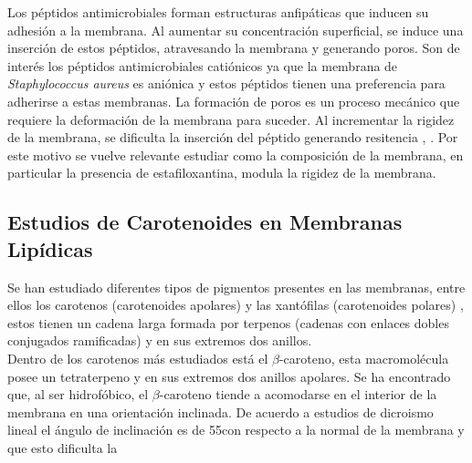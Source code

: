 Los p\'{e}ptidos antimicrobiales forman estructuras anfip\'{a}ticas que inducen su adhesi\'{o}n a la membrana. Al aumentar su concentraci\'{o}n superficial, se induce una inserci\'{o}n de estos p\'{e}ptidos, atravesando la membrana y generando poros. Son de inter\'{e}s los p\'{e}ptidos antimicrobiales cati\'{o}nicos ya que la membrana de \textit{Staphylococcus aureus} es ani\'{o}nica y estos p\'{e}ptidos tienen una preferencia para adherirse a estas membranas. La formaci\'{o}n de poros es un proceso mec\'{a}nico que requiere la deformaci\'{o}n de la membrana para suceder. Al incrementar la rigidez de la membrana, se dificulta la inserci\'{o}n del p\'{e}ptido generando resitencia \cite{Perez-Lopez2019VariationsProperties}, \cite{Nagendra2011}. Por este motivo se vuelve relevante estudiar como la composici\'{o}n de la membrana, en particular la presencia de estafiloxantina, modula la rigidez de la membrana.\\

\subsection{Estudios de Carotenoides en Membranas Lip\'{i}dicas}
Se han estudiado diferentes tipos de pigmentos presentes en las membranas, entre ellos los carotenos (carotenoides apolares) y las xant\'{o}filas (carotenoides polares) \cite{Gruszecki2004CarotenoidsProperties}, estos tienen un cadena larga formada por terpenos (cadenas con enlaces dobles conjugados ramificadas) y en sus extremos dos anillos.\\

Dentro de los carotenos m\'{a}s estudiados est\'{a} el $\beta$-caroteno, esta macromol\'{e}cula posee un tetraterpeno y en sus extremos dos anillos apolares. Se ha encontrado que, al ser hidrof\'{o}bico, el $\beta$-caroteno tiende a acomodarse en el interior de la membrana en una orientaci\'{o}n inclinada. De acuerdo a estudios de dicroismo lineal el \'{a}ngulo de inclinaci\'{o}n es de 55\textdegree  con respecto a la normal de la membrana y que esto dificulta la 
